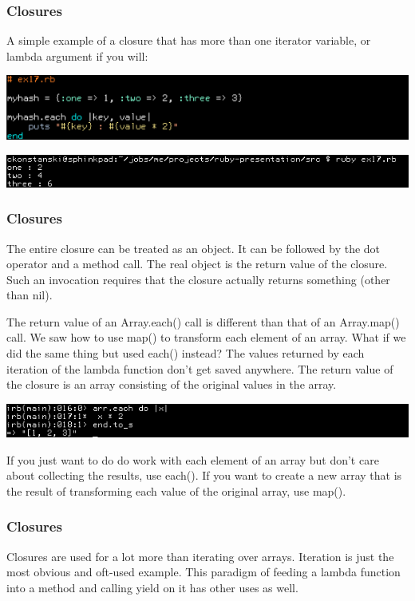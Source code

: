\documentclass[helvetica,english,utf8,notitle,nologo]{beamer}
\begin{document}
\begin{frame}
  \frametitle{Closures}

  A simple example of a closure that has more than one iterator
  variable, or lambda argument if you will:

  \includegraphics[scale=0.53]{src_17}

  \includegraphics[scale=0.5]{out_17}
\end{frame}

\begin{frame}
  \frametitle{Closures}

  The entire closure can be treated as an object. It can be followed
  by the dot operator and a method call. The real object is the return
  value of the closure. Such an invocation requires that the closure
  actually returns something (other than nil).

  The return value of an Array.each() call is different than that of
  an Array.map() call. We saw how to use map() to transform each
  element of an array. What if we did the same thing but used each()
  instead? The values returned by each iteration of the lambda
  function don't get saved anywhere. The return value of the closure
  is an array consisting of the original values in the array.
  
  \includegraphics[scale=0.5]{irb_7}

  If you just want to do do work with each element of an array but
  don't care about collecting the results, use each(). If you want to
  create a new array that is the result of transforming each value of
  the original array, use map().
\end{frame}

\begin{frame}
  \frametitle{Closures}

  Closures are used for a lot more than iterating over
  arrays. Iteration is just the most obvious and oft-used
  example. This paradigm of feeding a lambda function into a method
  and calling yield on it has other uses as well.
\end{frame}
\end{document}

